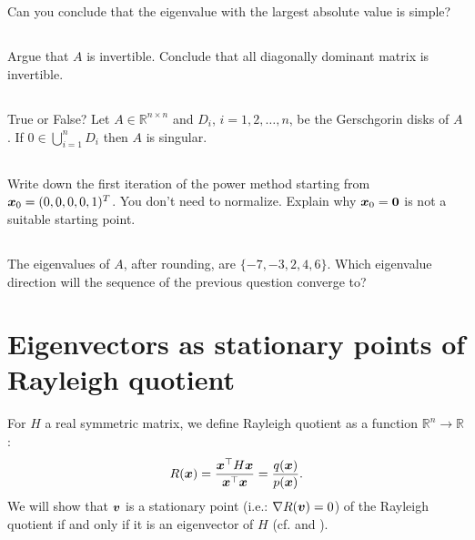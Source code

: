 \documentclass[11pt,letterpaper]{report}
\begin{document}
\subsection{}
Can you conclude that the eigenvalue with the largest absolute value is simple?

\subsection{}
Argue that $A$ is invertible. Conclude that all diagonally dominant matrix is invertible.

\subsection{}
True or False? Let $A \in \mathbb{R}^{n \times n}$ and $D_i$, $i
  = 1,2,\dots,n$, be the Gerschgorin disks of $A$. If $0 \in
  \bigcup_{i=1}^n D_i$ then $A$ is singular.
  
\subsection{}
Write down the first iteration of the power method starting from $\boldsymbol{x}_0 = (0,0,0,0,1)^T$.
You don't need to normalize.
Explain why $\boldsymbol{x}_0 = \boldsymbol{0}$ is not a suitable starting point.

\subsection{}
The eigenvalues of $A$, after rounding, are $\{-7, -3, 2, 4, 6\}$.
Which eigenvalue direction will the sequence of the previous question converge to?

\section{Eigenvectors as stationary points of Rayleigh quotient}

For $H$ a real symmetric matrix, we define Rayleigh quotient as a function $\mathbb{R}^n\to\mathbb{R}$:
\begin{align*}
    R(\boldsymbol{x}) = \frac{\boldsymbol{x}^\top H\boldsymbol{x}}{\boldsymbol{x}^\top \boldsymbol{x}} = \frac{q(\boldsymbol{x})}{p(\boldsymbol{x})}.
\end{align*}
We will show that $\boldsymbol{v}$ is a stationary point (i.e.: $\nabla R(\boldsymbol{v}) = 0$) of the Rayleigh quotient if and only if it is an eigenvector of $H$ (cf. \cite[p.114-116]{Lax_07} and \cite[p.203-204]{TrefethenBau_97}).
\end{document}
